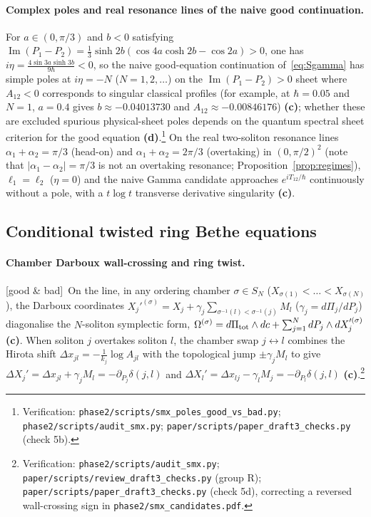\documentclass[11pt,a4paper]{article}
\newcommand{\lab}[1]{{\normalfont\sffamily\footnotesize\bfseries(#1)}}
\newcommand{\Lc}{\lab{c}}
\newcommand{\Ld}{\lab{d}}
\newcommand{\eqtag}[2]{{\normalfont\sffamily\footnotesize\textcolor{#1}{[#2]}}}
\newcommand{\Both}{\eqtag{violet!70!black}{good \& bad}}
\newcommand{\scr}[1]{\nolinkurl{#1}}
\newcommand{\chk}[1]{\footnote{\raggedright Verification: #1.}}
\newcommand{\hb}{\hbar}
\theoremstyle{remark}
\begin{document}
\paragraph{Complex poles and real resonance lines of the naive good continuation.} For $a\in(0,\pi/3)$ and $b<0$ satisfying $\operatorname{Im}(P_1-P_2)=\tfrac13\sinh2b(\cos4a\cosh2b-\cos2a)>0$, one has $i\eta=\frac{4\sin3a\sinh3b}{9\hb}<0$, so the naive good-equation continuation of~\eqref{eq:Sgamma} has simple poles at $i\eta=-N$ ($N=1,2,\dots$) on the $\operatorname{Im}(P_1-P_2)>0$ sheet where $A_{12}<0$ corresponds to singular classical profiles (for example, at $\hb=0.05$ and $N=1$, $a=0.4$ gives $b\approx-0.04013730$ and $A_{12}\approx-0.00846176$) \Lc; whether these are excluded spurious physical-sheet poles depends on the quantum spectral sheet criterion for the good equation \Ld.\chk{\scr{phase2/scripts/smx_poles_good_vs_bad.py}; \scr{phase2/scripts/audit_smx.py}; \scr{paper/scripts/paper_draft3_checks.py} (check 5b)}
On the real two-soliton resonance lines $\alpha_1+\alpha_2=\pi/3$ (head-on) and $\alpha_1+\alpha_2=2\pi/3$ (overtaking) in $(0,\pi/2)^2$ (note that $|\alpha_1-\alpha_2|=\pi/3$ is not an overtaking resonance; Proposition~\ref{prop:regimes}), $\ell_1=\ell_2$ ($\eta=0$) and the naive Gamma candidate approaches $e^{iT_{12}/\hb}$ continuously without a pole, with a $t\log t$ transverse derivative singularity \Lc.

\subsection{Conditional twisted ring Bethe equations}\label{sec:ringbethe}

\paragraph{Chamber Darboux wall-crossing and ring twist.} \Both\ On the line, in any ordering chamber $\sigma\in S_N$ ($X_{\sigma(1)}<\dots<X_{\sigma(N)}$), the Darboux coordinates $X_j'^{(\sigma)}=X_j+\gamma_j\sum_{\sigma^{-1}(l)<\sigma^{-1}(j)}M_l$ ($\gamma_j=d\Pi_j/dP_j$) diagonalise the $N$-soliton symplectic form, $\Omega^{(\sigma)}=d\Pi_{\rm tot}\wedge dc+\sum_{j=1}^NdP_j\wedge dX_j'^{(\sigma)}$ \Lc. When soliton $j$ overtakes soliton $l$, the chamber swap $j\leftrightarrow l$ combines the Hirota shift $\Delta x_{jl}=-\frac1{k_j}\log A_{jl}$ with the topological jump $\pm\gamma_jM_l$ to give $\Delta X_j'=\Delta x_{jl}+\gamma_jM_l=-\partial_{P_j}\delta(j,l)$ and $\Delta X_l'=\Delta x_{lj}-\gamma_lM_j=-\partial_{P_l}\delta(j,l)$ \Lc.\chk{\scr{phase2/scripts/audit_smx.py}; \scr{paper/scripts/review_draft3_checks.py} (group R); \scr{paper/scripts/paper_draft3_checks.py} (check 5d), correcting a reversed wall-crossing sign in \scr{phase2/smx_candidates.pdf}}
\end{document}
